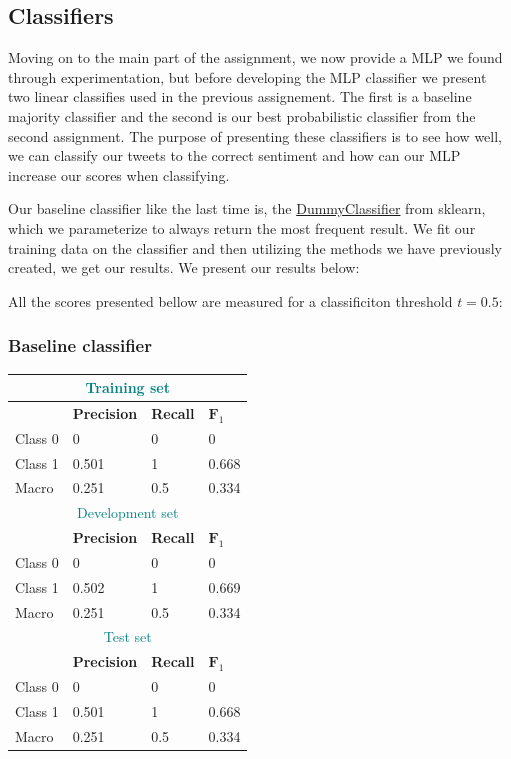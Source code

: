 \documentclass[10pt]{article}
\begin{document}
\bigskip
\subsection*{Classifiers}

Moving on to the main part of the assignment, we now provide a MLP we found through experimentation, but before developing the MLP classifier we present two linear classifies used in the previous assignement. The first is a baseline majority classifier and the second is our best probabilistic classifier from the second assignment. The purpose of presenting these classifiers is to see how well, we can classify our tweets to the correct sentiment and how can our MLP increase our scores when classifying.

Our baseline classifier like the last time is, the \href{https://scikit-learn.org/stable/modules/generated/sklearn.dummy.DummyClassifier.html}{DummyClassifier} from sklearn, which we parameterize to always return the most frequent result. We fit our training data on the classifier and then utilizing the methods we have previously created, we get our results. We present our results below: 

\bigskip
All the scores presented bellow are measured for a classificiton threshold $t = 0.5$:

\subsubsection*{Baseline classifier}
\begin{tabular}{ |p{2cm}||p{3cm}|p{3cm}|p{3cm}|  }
 \hline
 \multicolumn{4}{|c|}{\textcolor{teal}{Training set}} \\
 \hline
  & \textbf{Precision} &  \textbf{Recall} & $\textbf{F}_1$\\
 \hline
 Class 0 & 0    &  0 &   0 \\
 Class 1 & 0.501 & 1 & 0.668\\  \hline
 Macro & 0.251 &  0.5 &  0.334\\
 \hline
  \hline
  
   \multicolumn{4}{|c|}{\textcolor{teal}{Development set}} \\
 \hline
  & \textbf{Precision} &  \textbf{Recall} & $\textbf{F}_1$\\
 \hline
 Class 0 & 0 & 0 &  0 \\
 Class 1 & 0.502 & 1  & 0.669\\  \hline
 Macro & 0.251 &  0.5 &  0.334\\
 \hline
  \hline
  
  \multicolumn{4}{|c|}{\textcolor{teal}{Test set}} \\
 \hline
  & \textbf{Precision} &  \textbf{Recall} & $\textbf{F}_1$\\
 \hline
 Class 0 & 0   & 0 &  0\\
 Class 1 & 0.501  & 1  & 0.668\\  \hline
 Macro & 0.251 &  0.5 & 0.334\\
 \hline
 \hline
\end{tabular}
\end{document}
